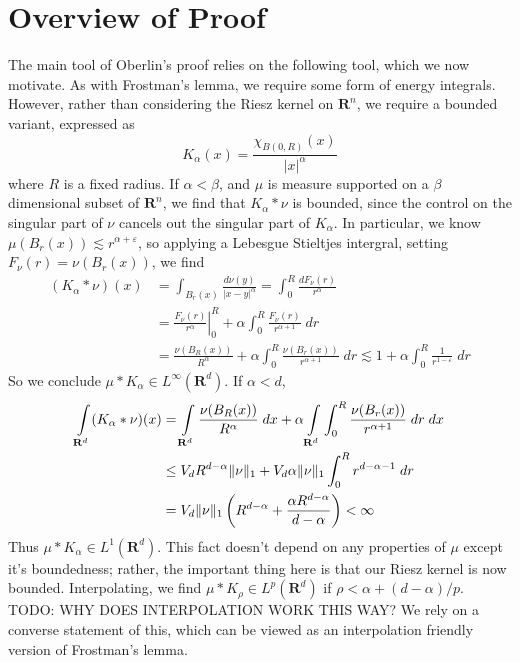 \documentclass{article}
\theoremstyle{plain}
\theoremstyle{remark}
\theoremstyle{definition}
\begin{document}
\section{Overview of Proof}

The main tool of Oberlin's proof relies on the following tool, which we now motivate. As with Frostman's lemma, we require some form of energy integrals. However, rather than considering the Riesz kernel on $\mathbf{R}^n$, we require a bounded variant, expressed as
%
\[ K_\alpha(x) = \frac{\chi_{B(0,R)}(x)}{|x|^\alpha} \]
%
where $R$ is a fixed radius. If $\alpha < \beta$, and $\mu$ is measure supported on a $\beta$ dimensional subset of $\mathbf{R}^n$, we find that $K_\alpha * \nu$ is bounded, since the control on the singular part of $\nu$ cancels out the singular part of $K_\alpha$. In particular, we know $\mu(B_r(x)) \lesssim r^{\alpha + \varepsilon}$, so applying a Lebesgue Stieltjes intergral, setting $F_\nu(r) = \nu(B_r(x))$, we find
%
\begin{align*}
	(K_\alpha * \nu)(x) &= \int_{B_r(x)} \frac{d\nu(y)}{|x - y|^\alpha} = \int_0^R \frac{dF_\nu(r)}{r^\alpha} \\
	&= \left. \frac{F_\nu(r)}{r^\alpha} \right|_0^R + \alpha \int_0^R \frac{F_\nu(r)}{r^{\alpha + 1}}\; dr\\
	&= \frac{\nu(B_R(x))}{R^\alpha} + \alpha \int_0^R \frac{\nu(B_r(x))}{r^{\alpha + 1}}\; dr \lesssim 1 + \alpha \int_0^R \frac{1}{r^{1 - \varepsilon}}\; dr
\end{align*}
%
So we conclude $\mu * K_\alpha \in L^\infty(\mathbf{R}^d)$. If $\alpha < d$,
%
\begin{align*}
	\int\displaylimits_{\mathbf{R}^d} (K_\alpha * \nu)(x) &= \int\displaylimits_{\mathbf{R}^d} \frac{\nu(B_R(x))}{R^{\alpha}} \; dx + \alpha \int\displaylimits_{\mathbf{R}^d} \int_0^R \frac{\nu(B_r(x))}{r^{\alpha + 1}}\; dr\; dx\\
	&\leq V_d R^{d-\alpha} \| \nu \|_1 + V_d \alpha \| \nu \|_1 \int_0^R r^{d - \alpha - 1}\; dr\\
	&= V_d \| \nu \|_1 \left( R^{d- \alpha} + \frac{\alpha R^{d-\alpha}}{d - \alpha} \right) < \infty
\end{align*}
%
Thus $\mu * K_\alpha \in L^1(\mathbf{R}^d)$. This fact doesn't depend on any properties of $\mu$ except it's boundedness; rather, the important thing here is that our Riesz kernel is now bounded. Interpolating, we find $\mu * K_\rho \in L^p(\mathbf{R}^d)$ if $\rho < \alpha + (d - \alpha)/p$. TODO: WHY DOES INTERPOLATION WORK THIS WAY? We rely on a converse statement of this, which can be viewed as an interpolation friendly version of Frostman's lemma.
\end{document}

